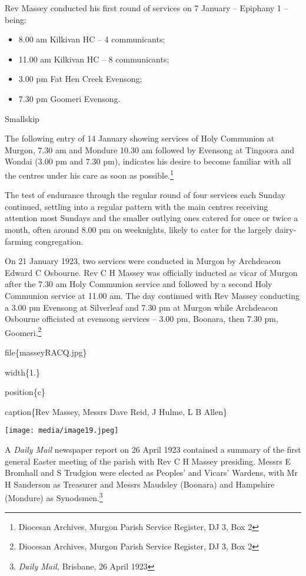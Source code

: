 Rev Massey conducted his first round of services on 7 January -- Epiphany 1 -- being:

\begin{itemize}
\item
  8.00 am Kilkivan HC -- 4 communicants;
\item
  11.00 am Kilkivan HC -- 8 communicants;
\item
  3.00 pm Fat Hen Creek Evensong;
\item
  7.30 pm Goomeri Evensong.
\end{itemize}

Smallskip

The following entry of 14 January showing services of Holy Communion at Murgon, 7.30 am and Mondure 10.30 am followed by Evensong at Tingoora and Wondai (3.00 pm and 7.30 pm), indicates his desire to become familiar with all the centres under his care as soon as possible.\footnote{Diocesan Archives, Murgon Parish Service Register, DJ 3, Box 2}

The test of endurance through the regular round of four services each Sunday continued, settling into a regular pattern with the main centres receiving attention most Sundays and the smaller outlying ones catered for once or twice a month, often around 8.00 pm on weeknights, likely to cater for the largely dairy-farming congregation.

On 21 January 1923, two services were conducted in Murgon by Archdeacon Edward C Osbourne. Rev C H Massey was officially inducted as vicar of Murgon after the 7.30 am Holy Communion service and followed by a second Holy Communion service at 11.00 am. The day continued with Rev Massey conducting a 3.00 pm Evensong at Silverleaf and 7.30 pm at Murgon while Archdeacon Osbourne officiated at evensong services -- 3.00 pm, Boonara, then 7.30 pm, Goomeri.\footnote{Diocesan Archives, Murgon Parish Service Register, DJ 3, Box 2}

file\{masseyRACQ.jpg\}

width\{1.\}

position\{c\}

caption\{Rev Massey, Messrs Dave Reid, J Hulme, L B Allen\}

\texttt{[image: media/image19.jpeg]}

A \emph{Daily Mail} newspaper report on 26 April 1923 contained a summary of the first general Easter meeting of the parish with Rev C H Massey presiding. Messrs E Bromhall and S Trudgion were elected as Peoples' and Vicars' Wardens, with Mr H Sanderson as Treasurer and Messrs Maudsley (Boonara) and Hampshire (Mondure) as Synodsmen.\footnote{\emph{Daily Mail,} Brisbane, 26 April 1923}

